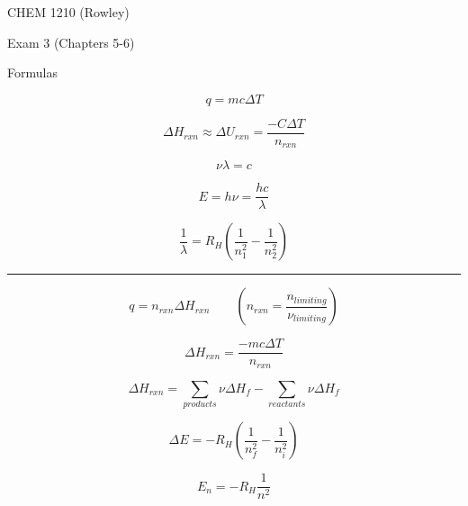 \documentclass[12pt, addpoints, letterpaper]{exam}
\begin{document}
\begin{center}
	\vspace{12em}
	{\Huge CHEM 1210 (Rowley) }

	{\LARGE Exam 3 (Chapters 5-6)}
\end{center}


\begin{center}
	{\large Formulas}

	\hrulefill
\end{center}

\noindent
\begin{minipage}[c][\stretch{1}][c]{0.495\linewidth}
	\begin{equation*}
		q=mc\Delta T
	\end{equation*}

	\begin{equation*}
		\Delta H_{rxn} \approx \Delta U_{rxn}	= \frac{-C\Delta T}{n_{rxn}}
	\end{equation*}

	\begin{equation*}
		\nu\lambda=c
	\end{equation*}

	\begin{equation*}
		E=h\nu=\frac{hc}{\lambda}
	\end{equation*}

	\begin{equation*}
		\frac{1}{\lambda} = R_H\left(\frac{1}{n_1^2}-\frac{1}{n_2^2}\right)
	\end{equation*}
\end{minipage}
\rule[-135pt]{1.5pt}{270pt}
\begin{minipage}[c][\stretch{1}][c]{0.495\linewidth}
	\begin{equation*}
		q=n_{rxn}\Delta H_{rxn} \hspace{2em} \left(n_{rxn}=\frac{n_{limiting}}{\nu_{limiting}}\right)
	\end{equation*}

	\begin{equation*}
		\Delta H_{rxn}	= \frac{-mc\Delta T}{n_{rxn}}
	\end{equation*}

	\begin{equation*}
		\Delta H_{rxn} = \sum\limits_{products}\nu\Delta H_{f}-\sum\limits_{reactants}\nu\Delta H_{f}
	\end{equation*}

	\begin{equation*}
		\Delta E = -R_H\left(\frac{1}{n_f^2}-\frac{1}{n_i^2}\right)
	\end{equation*}

	\begin{equation*}
		E_n = -R_H\frac{1}{n^2}
	\end{equation*}
\end{minipage}
\end{document}
